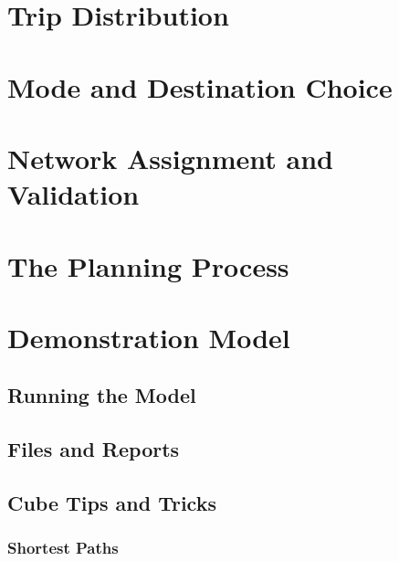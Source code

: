 \documentclass[]{book}
\begin{document}
\hypertarget{chap-distribution}{%
\chapter{Trip Distribution}\label{chap-distribution}}

\hypertarget{chap-modechoice}{%
\chapter{Mode and Destination Choice}\label{chap-modechoice}}

\hypertarget{chap-assignment}{%
\chapter{Network Assignment and Validation}\label{chap-assignment}}

\hypertarget{chap-process}{%
\chapter{The Planning Process}\label{chap-process}}

\hypertarget{appendix-appendix}{%
\appendix}


\hypertarget{app-demomodel}{%
\chapter{Demonstration Model}\label{app-demomodel}}

\hypertarget{running-the-model}{%
\section{Running the Model}\label{running-the-model}}

\hypertarget{files-and-reports}{%
\section{Files and Reports}\label{files-and-reports}}

\hypertarget{cube-tips-and-tricks}{%
\section{Cube Tips and Tricks}\label{cube-tips-and-tricks}}

\hypertarget{shortest-paths}{%
\subsection{Shortest Paths}\label{shortest-paths}}
\end{document}
